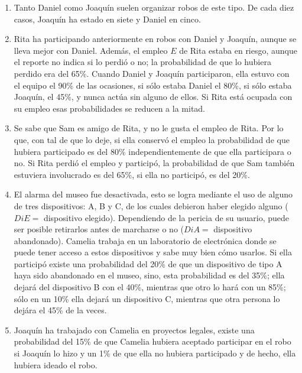 \begin{enumerate}

 \item Tanto Daniel como Joaquín suelen organizar robos de este tipo.  De cada diez casos, Joaquín ha estado en siete y Daniel en cinco.

 \item Rita ha participando anteriormente en robos con Daniel y Joaquín, aunque se lleva mejor con Daniel.  Además, el empleo $E$ de Rita estaba en riesgo, aunque el reporte no indica si lo perdió o no; la probabilidad de que lo hubiera perdido era del 65\%.  Cuando Daniel y Joaquín participaron, ella estuvo con el equipo el 90\% de las ocasiones, si sólo estaba Daniel el 80\%, si sólo estaba Joaquín, el 45\%, y nunca actúa sin alguno de ellos.  Si Rita está ocupada con su empleo esas probabilidades se reducen a la mitad.

 \item Se sabe que Sam es amigo de Rita, y no le gusta el empleo de Rita.  Por lo que, con tal de que lo deje, si ella conservó el empleo la probabilidad de que hubiera participado es del 80\% independientemente de que ella participara o no.  Si Rita perdió el empleo y participó, la probabilidad de que Sam también estuviera involucrado es del 65\%, si ella no participó, es del 20\%.

 \item  El alarma del museo fue desactivada, esto se logra mediante el uso de alguno de tres dispositivos: A, B y C, de los cuales debieron haber elegido alguno ($DiE = $ dispositivo elegido).  Dependiendo de la pericia de su usuario, puede ser posible retirarlos antes de marcharse o no ($DiA = $ dispositivo abandonado).   Camelia trabaja en un laboratorio de electrónica donde se puede tener acceso a estos dispositivos y sabe muy bien cómo usarlos.  Si ella participó existe una probabilidad del 20\% de que un dispositivo de tipo A haya sido abandonado en el museo, sino, esta probabilidad es del 35\%; ella dejará del dispositivo B con el  40\%, mientras que otro lo hará con un  85\%; sólo en un 10\% ella dejará un dispositivo C, mientras que otra persona lo dejára el 45\% de la veces.

 \item Joaquín ha trabajado con Camelia en proyectos legales, existe una probabilidad del 15\% de que Camelia hubiera aceptado participar en el robo si Joaquín lo hizo y un 1\% de que ella no hubiera participado y de hecho, ella hubiera ideado el robo.


\end{enumerate}
